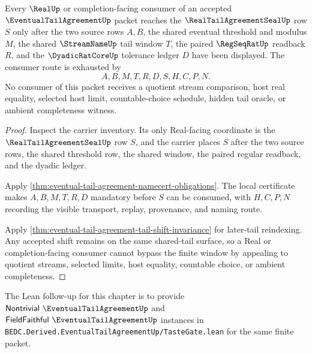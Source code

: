 \begin{theorem}
\label{thm:eventual-tail-agreement-real-seal-handoff}
Every $\RealUp$ or completion-facing consumer of an accepted $\EventualTailAgreementUp$ packet reaches the $\RealTailAgreementSealUp$ row $S$ only after the two source rows $A,B$, the shared eventual threshold and modulus $M$, the shared $\StreamNameUp$ tail window $T$, the paired $\RegSeqRatUp$ readback $R$, and the $\DyadicRatCoreUp$ tolerance ledger $D$ have been displayed. The consumer route is exhausted by
$$
A,B,M,T,R,D,S,H,C,P,N.
$$
No consumer of this packet receives a quotient stream comparison, host real equality, selected host limit, countable-choice schedule, hidden tail oracle, or ambient completeness witness.
\end{theorem}
\begin{proof}
Inspect the carrier inventory. Its only Real-facing coordinate is the $\RealTailAgreementSealUp$ row $S$, and the carrier places $S$ after the two source rows, the shared threshold row, the shared window, the paired regular readback, and the dyadic ledger.

Apply \autoref{thm:eventual-tail-agreement-namecert-obligations}. The local certificate makes $A,B,M,T,R,D$ mandatory before $S$ can be consumed, with $H,C,P,N$ recording the visible transport, replay, provenance, and naming route.

Apply \autoref{thm:eventual-tail-agreement-tail-shift-invariance} for later-tail reindexing. Any accepted shift remains on the same shared-tail surface, so a Real or completion-facing consumer cannot bypass the finite window by appealing to quotient streams, selected limits, host equality, countable choice, or ambient completeness.
\end{proof}

The Lean follow-up for this chapter is to provide $\mathsf{Nontrivial}\ \EventualTailAgreementUp$ and $\mathsf{FieldFaithful}\ \EventualTailAgreementUp$ instances in \texttt{BEDC.Derived.EventualTailAgreementUp/TasteGate.lean} for the same finite packet.


